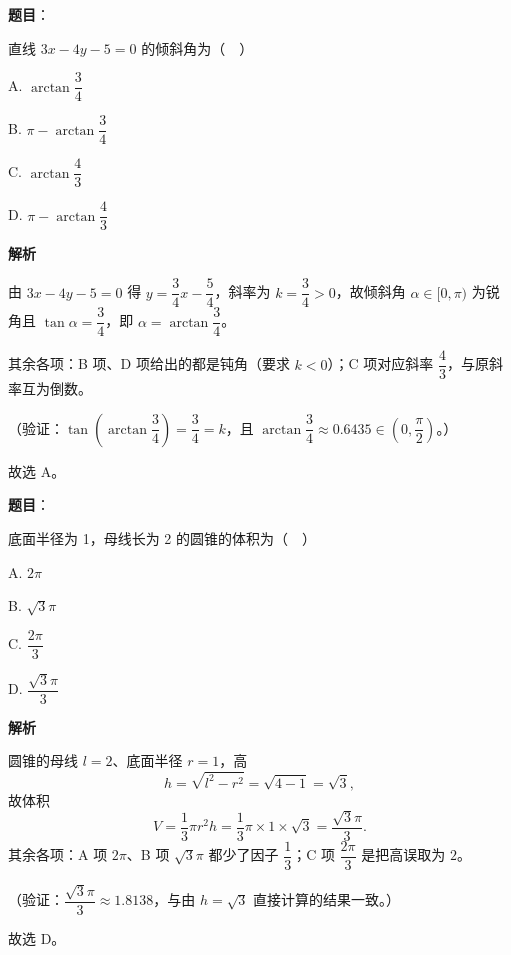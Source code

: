 \begin{answer}

\textbf{题目}：

直线 \(3x-4y-5=0\) 的倾斜角为（　）

A. \(\arctan\dfrac{3}{4}\)

B. \(\pi-\arctan\dfrac{3}{4}\)

C. \(\arctan\dfrac{4}{3}\)

D. \(\pi-\arctan\dfrac{4}{3}\)

\textbf{解析}

由 \(3x-4y-5=0\) 得 \(y=\dfrac{3}{4}x-\dfrac{5}{4}\)，斜率为 \(k=\dfrac{3}{4}>0\)，故倾斜角 \(\alpha\in[0,\pi)\) 为锐角且 \(\tan\alpha=\dfrac{3}{4}\)，即 \(\alpha=\arctan\dfrac{3}{4}\)。

其余各项：B 项、D 项给出的都是钝角（要求 \(k<0\)）；C 项对应斜率 \(\dfrac{4}{3}\)，与原斜率互为倒数。

（验证：\(\tan\left(\arctan\dfrac{3}{4}\right)=\dfrac{3}{4}=k\)，且 \(\arctan\dfrac{3}{4}\approx0.6435\in\left(0,\dfrac{\pi}{2}\right)\)。）

故选 A。


\end{answer}
\begin{answer}

\textbf{题目}：

底面半径为 1，母线长为 2 的圆锥的体积为（　）

A. \(2\pi\)

B. \(\sqrt{3}\pi\)

C. \(\dfrac{2\pi}{3}\)

D. \(\dfrac{\sqrt{3}\pi}{3}\)

\textbf{解析}

圆锥的母线 \(l=2\)、底面半径 \(r=1\)，高
\nopagebreak[4]
\[
h=\sqrt{l^{2}-r^{2}}=\sqrt{4-1}=\sqrt{3},
\]
故体积
\nopagebreak[4]
\[
V=\frac{1}{3}\pi r^{2}h=\frac{1}{3}\pi\times1\times\sqrt{3}=\frac{\sqrt{3}\pi}{3}.
\]
其余各项：A 项 \(2\pi\)、B 项 \(\sqrt{3}\pi\) 都少了因子 \(\dfrac{1}{3}\)；C 项 \(\dfrac{2\pi}{3}\) 是把高误取为 \(2\)。

（验证：\(\dfrac{\sqrt{3}\pi}{3}\approx1.8138\)，与由 \(h=\sqrt{3}\) 直接计算的结果一致。）

故选 D。


\end{answer}
